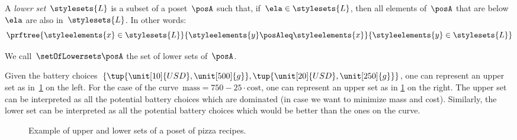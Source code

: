 \begin{definition}
    \label{def:lowerset}
    A \emph{lower set}~$\stylesets{L}$ is a subset of a poset~$\posA$ such that, if~$\ela \in \stylesets{L}$, then all elements of~$\posA$ that are below~$\ela$ are also in~$\stylesets{L}$.
    In other words:
    \begin{equation}
        \prftree{\styleelements{x}\in \stylesets{L}}{\styleelements{y}\posAleq \styleelements{x}}{\styleelements{y}\in \stylesets{L}}
    \end{equation}
\end{definition}
We call~$\setOfLowersets \posA$ the set of lower sets of~$\posA$.
%

Given the battery choices~$\{\tup{\unit[10]{USD},\unit[500]{g}},\tup{\unit[20]{USD},\unit[250]{g}}\}$, one can represent an upper set as in~\cref{fig:upperset} on the left.
For the case of the curve~$\text{mass}=750-25\cdot \text{cost}$, one can represent an upper set as in \cref{fig:upperset} on the right.
The upper set can be interpreted as all the potential battery choices which are dominated (in case we want to minimize mass and cost).
Similarly, the lower set can be interpreted as all the potential battery choices which would be better than the ones on the curve.

\begin{figure}[h!]
    \centering
    \caption{Example of upper and lower sets of a poset of pizza recipes.}
    \label{fig:upperset}
\end{figure}

%
